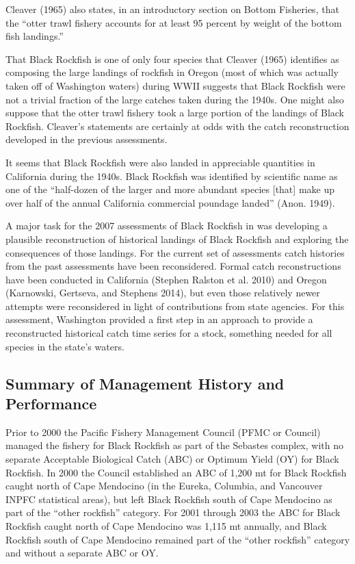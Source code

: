 \documentclass[11pt,
  english,
  letterpaper,
]{article}
\begin{document}
Cleaver (1965) also states, in an introductory section on Bottom Fisheries, that the ``otter trawl fishery accounts for at least 95 percent by weight of the bottom fish landings.''

That Black Rockfish is one of only four species that Cleaver (1965) identifies as composing the large landings of rockfish in Oregon (most of which was actually taken off of Washington waters) during WWII suggests that Black Rockfish were not a trivial fraction of the large catches taken during the 1940s. One might also suppose that the otter trawl fishery took a large portion of the landings of Black Rockfish. Cleaver's statements are certainly at odds with the catch reconstruction developed in the previous assessments.

It seems that Black Rockfish were also landed in appreciable quantities in California during the 1940s. Black Rockfish was identified by scientific name as one of the ``half-dozen of the larger and more abundant species {[}that{]} make up over half of the annual California commercial poundage landed'' (Anon. 1949).

A major task for the 2007 assessments of Black Rockfish in was developing a plausible reconstruction of historical landings of Black Rockfish and exploring the consequences of those landings. For the current set of assessments catch histories from the past assessments have been reconsidered. Formal catch reconstructions have been conducted in California (Stephen Ralston et al. 2010) and Oregon (Karnowski, Gertseva, and Stephens 2014), but even those relatively newer attempts were reconsidered in light of contributions from state agencies. For this assessment, Washington provided a first step in an approach to provide a reconstructed historical catch time series for a stock, something needed for all species in the state's waters.

\hypertarget{summary-of-management-history-and-performance}{%
\subsection{Summary of Management History and Performance}\label{summary-of-management-history-and-performance}}

Prior to 2000 the Pacific Fishery Management Council (PFMC or Council) managed the fishery for Black Rockfish as part of the Sebastes complex, with no separate Acceptable Biological Catch (ABC) or Optimum Yield (OY) for Black Rockfish. In 2000 the Council established an ABC of 1,200 mt for Black Rockfish caught north of Cape Mendocino (in the Eureka, Columbia, and Vancouver INPFC statistical areas), but left Black Rockfish south of Cape Mendocino as part of the ``other rockfish'' category. For 2001 through 2003 the ABC for Black Rockfish caught north of Cape Mendocino was 1,115 mt annually, and Black Rockfish south of Cape Mendocino remained part of the ``other rockfish'' category and without a separate ABC or OY.
\end{document}
